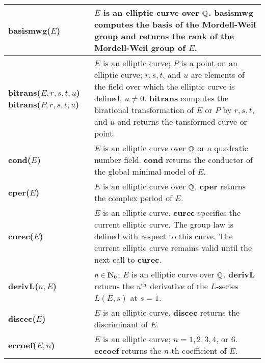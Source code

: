 {\begin{tabular}{|p{1.95in}|p{3.83in}|}
{\bf basismwg($E$)} &
$E$ is an elliptic curve over $\mbox{$\mathbb Q$}$.\newline
{\bf basismwg} computes the basis of the Mordell-Weil group and returns the
rank of the Mordell-Weil group of $E$.\\ \hline

{\bf bitrans($E,r,s,t,u$)\newline
bitrans($P,r,s,t,u$)} &
$E$ is an elliptic curve; $P$ is a point on an elliptic curve; 
$r,s,t$, and $u$ are elements of the field over
which the elliptic curve is defined, $u \neq 0$.\newline
{\bf bitrans} computes the birational transformation of $E$ or $P$ by 
$r,s,t$, and $u$ and returns the tansformed curve or point.\\ \hline

{\bf cond($E$)} &
$E$ is an elliptic curve over $\mbox{$\mathbb Q$}$ or a quadratic number field.\newline
{\bf cond} returns the conductor of the global minimal model of $E$.\\ \hline

{\bf cper($E$)} &
$E$ is an elliptic curve over $\mbox{$\mathbb Q$}$.\newline
{\bf cper} returns the complex period of $E$.\\ \hline

{\bf curec($E$)} &
$E$ is an elliptic curve.\newline
{\bf curec} specifies the current elliptic curve. The group law is
defined with respect to this curve. The current elliptic curve remains
valid until the next call to {\bf curec}.\\ \hline

{\bf derivL($n, E$)} &
$n \in {\rm{I\!N}}_0$; $E$ is an elliptic curve over $\mbox{$\mathbb Q$}$.\newline
{\bf derivL} returns the $n^{\rm th}$ derivative of the
$L$-series $L(E, s)$ at $s = 1$.\\ \hline

{\bf discec($E$)} &
$E$ is an elliptic curve.\newline
{\bf discec} returns the discriminant of $E$.\\ \hline

{\bf eccoef($E,n$)} &
$E$ is an elliptic curve; $n = 1, 2, 3, 4$, or $6$.\newline
{\bf eccoef} returns the $n$-th coefficient of $E$.\\ \hline
\end{tabular}

\newpage

}
